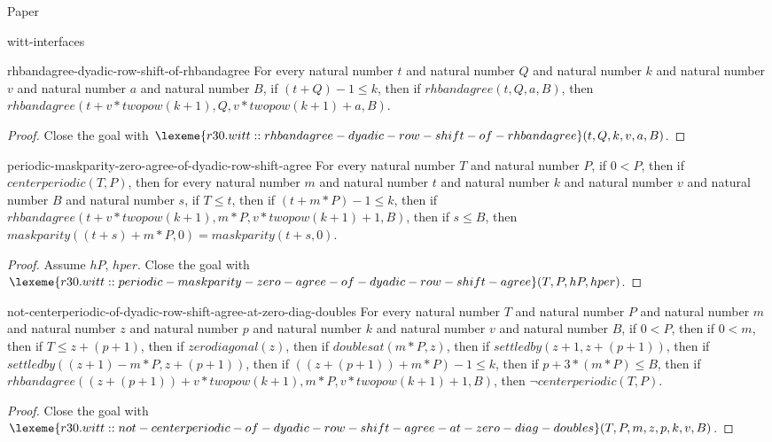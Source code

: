 \begin{lexlean}{Paper}
\begin{section}{witt-interfaces}
  \begin{theorem}{rhbandagree-dyadic-row-shift-of-rhbandagree}
  For every natural number \(t\) and natural number \(Q\) and natural number \(k\) and natural number \(v\) and natural number \(a\) and natural number \(B\), if \((t + Q) - 1 ≤ k\), then if \(rhbandagree(t, Q, a, B)\), then \(rhbandagree(t + v * twopow(k + 1), Q, v * twopow(k + 1) + a, B)\).
  \begin{proof}
  Close the goal with \(\lexeme{r30.witt::rhbandagree-dyadic-row-shift-of-rhbandagree}(t, Q, k, v, a, B)\).
  \end{proof}
  \end{theorem}

  \begin{theorem}{periodic-maskparity-zero-agree-of-dyadic-row-shift-agree}
  For every natural number \(T\) and natural number \(P\), if \(0 < P\), then if \(centerperiodic(T, P)\), then for every natural number \(m\) and natural number \(t\) and natural number \(k\) and natural number \(v\) and natural number \(B\) and natural number \(s\), if \(T ≤ t\), then if \((t + m * P) - 1 ≤ k\), then if \(rhbandagree(t + v * twopow(k + 1), m * P, v * twopow(k + 1) + 1, B)\), then if \(s ≤ B\), then \(maskparity((t + s) + m * P, 0) = maskparity(t + s, 0)\).
  \begin{proof}
  Assume \(hP\), \(hper\).
  Close the goal with \(\lexeme{r30.witt::periodic-maskparity-zero-agree-of-dyadic-row-shift-agree}(T, P, hP, hper)\).
  \end{proof}
  \end{theorem}

  \begin{theorem}{not-centerperiodic-of-dyadic-row-shift-agree-at-zero-diag-doubles}
  For every natural number \(T\) and natural number \(P\) and natural number \(m\) and natural number \(z\) and natural number \(p\) and natural number \(k\) and natural number \(v\) and natural number \(B\), if \(0 < P\), then if \(0 < m\), then if \(T ≤ z + (p + 1)\), then if \(zerodiagonal(z)\), then if \(doublesat(m * P, z)\), then if \(settledby(z + 1, z + (p + 1))\), then if \(settledby((z + 1) - m * P, z + (p + 1))\), then if \(((z + (p + 1)) + m * P) - 1 ≤ k\), then if \(p + 3 * (m * P) ≤ B\), then if \(rhbandagree((z + (p + 1)) + v * twopow(k + 1), m * P, v * twopow(k + 1) + 1, B)\), then \(¬ centerperiodic(T, P)\).
  \begin{proof}
  Close the goal with \(\lexeme{r30.witt::not-centerperiodic-of-dyadic-row-shift-agree-at-zero-diag-doubles}(T, P, m, z, p, k, v, B)\).
  \end{proof}
  \end{theorem}


\end{section}
\end{lexlean}
